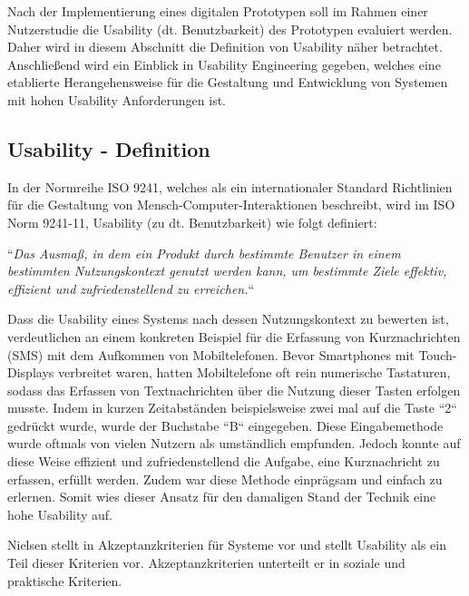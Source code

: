 Nach der Implementierung eines digitalen Prototypen soll im Rahmen einer Nutzerstudie die Usability (dt. Benutzbarkeit) des Prototypen evaluiert werden.
Daher wird in diesem Abschnitt die Definition von Usability näher betrachtet. Anschließend wird ein Einblick in Usability Engineering gegeben, welches eine etablierte Herangehensweise für
die Gestaltung und Entwicklung von Systemen mit hohen Usability Anforderungen ist. 

\subsection{Usability - Definition} \label{UsaDef}

In der Normreihe ISO 9241, welches als ein internationaler Standard Richtlinien für die Gestaltung von Mensch-Computer-Interaktionen beschreibt, wird im ISO Norm 9241-11,  Usability (zu dt. Benutzbarkeit) wie folgt definiert:

``\textit{Das Ausmaß, in dem ein Produkt durch bestimmte Benutzer in einem bestimmten Nutzungskontext genutzt werden kann, um bestimmte Ziele effektiv, effizient und zufriedenstellend zu erreichen.}``

Dass die Usability eines Systems nach dessen Nutzungskontext zu bewerten ist, verdeutlichen \cite[S.~10]{MichaelRichter2016} an einem konkreten Beispiel für die Erfassung 
von Kurznachrichten (SMS) mit dem Aufkommen von Mobiltelefonen. Bevor Smartphones mit Touch-Displays verbreitet waren, hatten Mobiltelefone oft rein numerische Tastaturen, sodass das Erfassen 
von Textnachrichten über die Nutzung dieser Tasten erfolgen musste. Indem in kurzen Zeitabständen beispielsweise zwei mal auf die Taste ``2`` gedrückt wurde, wurde der Buchstabe 
``B`` eingegeben. Diese Eingabemethode wurde oftmals von vielen Nutzern als umständlich empfunden. Jedoch konnte auf diese Weise effizient und zufriedenstellend die Aufgabe, eine Kurznachricht 
zu erfassen, erfüllt werden. Zudem war diese Methode einprägsam und einfach zu erlernen. Somit wies dieser Ansatz für den damaligen Stand der Technik eine hohe Usability auf. 

Nielsen stellt in \cite[S.~25]{Nielsen1994} Akzeptanzkriterien für Systeme vor und stellt Usability als ein Teil dieser Kriterien vor.
Akzeptanzkriterien unterteilt er in soziale und praktische Kriterien.

